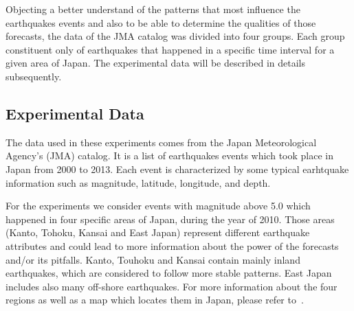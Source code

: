 Objecting a better understand of the patterns that most influence the
earthquakes events and also to be able to determine the qualities of
those forecasts, the data of the JMA catalog was divided into four
groups. Each group constituent only of earthquakes that happened in a
specific time interval for a given area of Japan. The experimental
data will be described in details subsequently.

\subsection{Experimental Data}
The data used in these experiments comes from the Japan Meteorological
Agency's (JMA) catalog. It is a list of earthquakes events which took
place in Japan from 2000 to 2013. Each event is characterized by some
typical earhtquake information such as magnitude, latitude, longitude,
and depth.

For the experiments we consider events with magnitude above 5.0 which
happened in four specific areas of Japan, during the year of
2010. Those areas (Kanto, Tohoku, Kansai and East Japan) represent
different earthquake attributes and could lead to more information
about the power of the forecasts and/or its pitfalls. Kanto, Touhoku
and Kansai contain mainly inland earthquakes, which are considered to
follow more stable patterns. East Japan includes also many off-shore
earthquakes. For more information about the four regions as well as a
map which locates them in Japan, please refer to~\cite{ecta14}.






